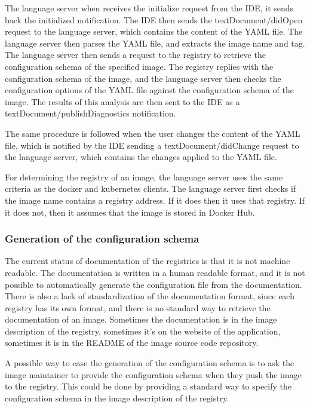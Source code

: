 \documentclass[
  11pt,
]{article}
\begin{document}
The language server when receives the initialize request from the IDE,
it sends back the initialized notification. The IDE then sends the
textDocument/didOpen request to the language server, which contains the
content of the YAML file. The language server then parses the YAML file,
and extracts the image name and tag. The language server then sends a
request to the registry to retrieve the configuration schema of the
specified image. The registry replies with the configuration schema of
the image, and the language server then checks the configuration options
of the YAML file against the configuration schema of the image. The
results of this analysis are then sent to the IDE as a
textDocument/publishDiagnostics notification.

The same procedure is followed when the user changes the content of the
YAML file, which is notified by the IDE sending a textDocument/didChange
request to the language server, which contains the changes applied to
the YAML file.

For determining the registry of an image, the language server uses the
same criteria as the docker and kubernetes clients. The language server
first checks if the image name contains a registry address. If it does
then it uses that registry. If it does not, then it assumes that the
image is stored in Docker Hub.

\hypertarget{generation-of-the-configuration-schema}{%
\subsubsection{Generation of the configuration
schema}\label{generation-of-the-configuration-schema}}

The current status of documentation of the registries is that it is not
machine readable. The documentation is written in a human readable
format, and it is not possible to automatically generate the
configuration file from the documentation. There is also a lack of
standardization of the documentation format, since each registry has its
own format, and there is no standard way to retrieve the documentation
of an image. Sometimes the documentation is in the image description of
the registry, sometimes it's on the website of the application,
sometimes it is in the README of the image source code repository.

A possible way to ease the generation of the configuration schema is to
ask the image maintainer to provide the configuration schema when they
push the image to the registry. This could be done by providing a
standard way to specify the configuration schema in the image
description of the registry.
\end{document}
